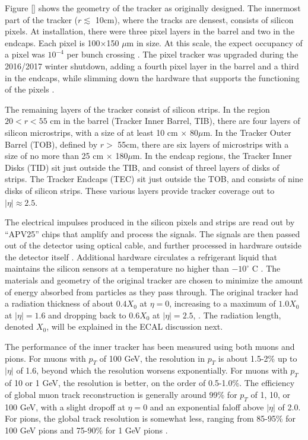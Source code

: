 
Figure \ref{} shows the geometry of the tracker as originally designed.
The innermost part of the tracker ($r \lesssim$ 10cm), where the tracks are densest,
consists of silicon pixels. At installation, there were three pixel
layers in the barrel and two in the endcaps. Each pixel is
100$\times$150 $\mu$m in size. At this scale, the expect occupancy of
a pixel was $10^{-4}$ per bunch crossing \cite{tdr}. The pixel tracker
was upgraded during the 2016/2017 winter shutdown, adding a fourth
pixel layer in the barrel and a third in the endcaps, while slimming
down the hardware that supports the functioning of the pixels
\cite{pixeltdr}.

The remaining layers of the tracker consist of silicon strips. In the
region $20 < r < 55$ cm in the barrel (Tracker Inner Barrel, TIB),
there are four layers of silicon
microstrips, with a size of at least 10 cm $\times$ 80$\mu$m. In the
Tracker Outer Barrel (TOB), defined by $r >$ 55cm, there are six
layers of microstrips with a size of no more than 25 cm $\times$
180$\mu$m. In the endcap regions, the Tracker Inner Disks (TID) sit
just outside the TIB, and consist of threel layers of disks of
strips. The Tracker Endcaps (TEC) sit just outside the TOB, and
consists of nine disks of silicon strips. These various layers provide
tracker coverage out to $|\eta| \approx 2.5$.

The electrical impulses produced in the silicon pixels and strips are
read out by ``APV25'' chips that amplify and process the signals. The
signals are then passed out of the detector using optical cable, and
further processed in hardware outside the detector itself
\cite{tdr}. Additional hardware circulates a refrigerant liquid that
maintains the silicon sensors at a temperature no higher than
$-10^\circ$ C \cite{accelexper}. The materials and geometry of the
original tracker are chosen to minimize the amount of energy absorbed
from particles as they pass through. The original
tracker had a radiation thickness of about $0.4 X_0$ at $\eta = 0$,
increasing to a maximum of $1.0 X_0$ at $|\eta| = 1.6$ and dropping
back to $0.6 X_0$ at $|\eta|=2.5$, \cite{tdr}. The radiation length,
denoted $X_0$, will be explained in the ECAL discussion next.

The performance of the inner tracker has been measured using both
muons and pions. For muons with $p_T$ of 100 GeV, the resolution
in $p_T$ is about 1.5-2\% up to $|\eta|$ of 1.6, beyond which the
resolution worsens exponentially. For muons with $p_T$ of 10 or 1 GeV,
the resolution is better, on the order of 0.5-1.0\%. The efficiency of
global muon track reconstruction is generally around 99\% for $p_T$ of
1, 10, or 100 GeV, with a slight dropoff at $\eta=0$ and an
exponential faloff above $|\eta|$ of 2.0. For pions, the global track
resolution is somewhat less, ranging from 85-95\% for 100 GeV pions and
75-90\% for 1 GeV pions \cite{tdr}.

